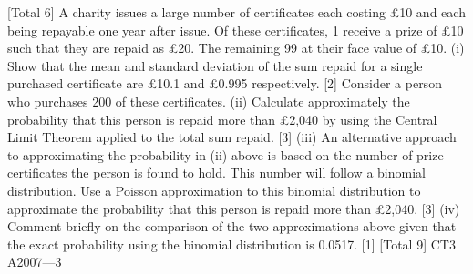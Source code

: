 [Total 6]
A charity issues a large number of certificates each costing £10 and each being
repayable one year after issue. Of these certificates, 1%
receive a prize of £10 such that they are repaid as £20. The remaining 99%
at their face value of £10.
(i)
Show that the mean and standard deviation of the sum repaid for a single
purchased certificate are £10.1 and £0.995 respectively.
[2]
Consider a person who purchases 200 of these certificates.
(ii)
Calculate approximately the probability that this person is repaid more than
£2,040 by using the Central Limit Theorem applied to the total sum repaid.
[3]
(iii)
An alternative approach to approximating the probability in (ii) above is based
on the number of prize certificates the person is found to hold. This number
will follow a binomial distribution.
Use a Poisson approximation to this binomial distribution to approximate the
probability that this person is repaid more than £2,040.
[3]
(iv)
Comment briefly on the comparison of the two approximations above given
that the exact probability using the binomial distribution is 0.0517.
[1]
[Total 9]
CT3 A2007—3
